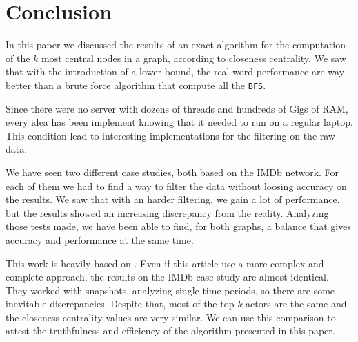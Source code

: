 \section{Conclusion}

In this paper we discussed the results of an exact algorithm for the computation of the $k$ most central nodes in a graph, according to closeness centrality. We saw that with the introduction of a lower bound, the real word performance are way better than a brute force algorithm that compute all the \texttt{BFS}. \s

\nd Since there were no server with dozens of threads and hundreds of Gigs of RAM, every idea has been implement knowing that it needed to run on a regular laptop. This condition lead to interesting implementations for the filtering on the raw data. \s

\nd We have seen two different case studies, both based on the IMDb network. For each of them we had to find a way to filter the data without loosing accuracy on the results. We saw that with an harder filtering, we gain a lot of performance, but the results showed an increasing discrepancy from the reality. Analyzing those tests made, we have been able to find, for both graphs, a balance that gives accuracy and performance at the same time.

\s \nd This work is heavily based on \cite{DBLP:journals/corr/BergaminiBCMM17}. Even if this article use a more complex and complete approach, the results on the IMDb case study are almost identical. They worked with snapshots, analyzing single time periods, so there are some inevitable discrepancies. Despite that, most of the top-$k$ actors are the same and the closeness centrality values are very similar. We can use this comparison to attest the truthfulness and efficiency of the algorithm presented in this paper.
